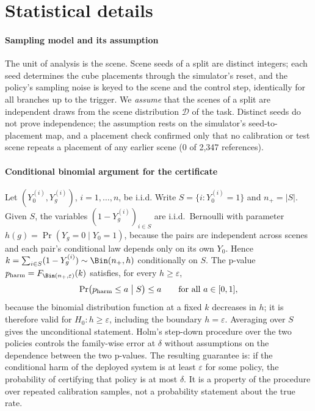 \section{Statistical details}\label{sec:s-stats}

\paragraph{Sampling model and its assumption} The unit of analysis is the scene. Scene seeds of a split are distinct integers; each seed determines the cube placements through the simulator's reset, and the policy's sampling noise is keyed to the scene and the control step, identically for all branches up to the trigger. We \emph{assume} that the scenes of a split are independent draws from the scene distribution $\mathcal{D}$ of the task. Distinct seeds do not prove independence; the assumption rests on the simulator's seed-to-placement map, and a placement check confirmed only that no calibration or test scene repeats a placement of any earlier scene (0 of 2,347 references).

\paragraph{Conditional binomial argument for the certificate} Let $(Y_0^{(i)},Y_g^{(i)})$, $i=1,\dots,n$, be i.i.d. Write $S=\{i: Y_0^{(i)}=1\}$ and $n_+=|S|$. Given $S$, the variables $(1-Y_g^{(i)})_{i\in S}$ are i.i.d.\ Bernoulli with parameter $h(g)=\Pr(Y_g=0\mid Y_0=1)$, because the pairs are independent across scenes and each pair's conditional law depends only on its own $Y_0$. Hence $k=\sum_{i\in S}(1-Y_g^{(i)})\sim\Bin(n_+,h)$ conditionally on $S$. The p-value $p_{\mathrm{harm}}=F_{\Bin(n_+,\varepsilon)}(k)$ satisfies, for every $h\ge\varepsilon$,
\begin{equation}
\Pr\bigl(p_{\mathrm{harm}}\le a \bigm| S\bigr)\le a\qquad\text{for all } a\in[0,1],
\end{equation}
because the binomial distribution function at a fixed $k$ decreases in $h$; it is therefore valid for $H_0: h\ge\varepsilon$, including the boundary $h=\varepsilon$. Averaging over $S$ gives the unconditional statement. Holm's step-down procedure over the two policies controls the family-wise error at $\delta$ without assumptions on the dependence between the two p-values. The resulting guarantee is: if the conditional harm of the deployed system is at least $\varepsilon$ for some policy, the probability of certifying that policy is at most $\delta$. It is a property of the procedure over repeated calibration samples, not a probability statement about the true rate.

